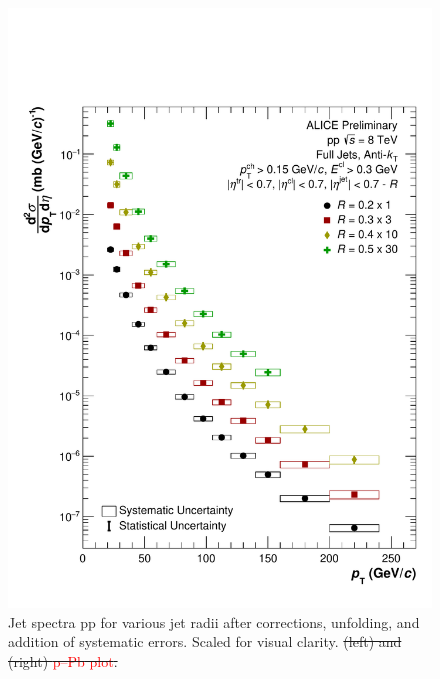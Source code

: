\documentclass[ALICE]{ALICE_analysis_notes}
\newcommand{\pPb}{{\mbox{p--Pb}}\xspace}
\newcommand{\pp}{pp\xspace}
\providecommand{\DIFaddtex}[1]{{\protect\color{blue}\uwave{#1}}} %
\providecommand{\DIFdeltex}[1]{{\protect\color{red}\sout{#1}}}                      %
\providecommand{\DIFaddFL}[1]{\DIFadd{#1}} %
\providecommand{\DIFdelFL}[1]{\DIFdel{#1}} %
\providecommand{\DIFaddbeginFL}{} %
\providecommand{\DIFaddendFL}{} %
\providecommand{\DIFdelbeginFL}{} %
\providecommand{\DIFdelendFL}{} %
\providecommand{\DIFadd}[1]{\texorpdfstring{\DIFaddtex{#1}}{#1}} %
\providecommand{\DIFdel}[1]{\texorpdfstring{\DIFdeltex{#1}}{}} %
\newcommand{\DIFscaledelfig}{0.5}
\newlength{\DIFdelgraphicswidth} %
\newlength{\DIFdelgraphicsheight} %
\newcommand{\DIFaddincludegraphics}[2][]{{\color{blue}\fbox{\DIFOincludegraphics[#1]{#2}}}} %
\newcommand{\DIFdelincludegraphics}[2][]{%
\sbox{\DIFdelgraphicsbox}{\DIFOincludegraphics[#1]{#2}}%
\settoboxwidth{\DIFdelgraphicswidth}{\DIFdelgraphicsbox} %
\settoboxtotalheight{\DIFdelgraphicsheight}{\DIFdelgraphicsbox} %
\scalebox{\DIFscaledelfig}{%
\parbox[b]{\DIFdelgraphicswidth}{\usebox{\DIFdelgraphicsbox}\\[-\baselineskip] \rule{\DIFdelgraphicswidth}{0em}}\llap{\resizebox{\DIFdelgraphicswidth}{\DIFdelgraphicsheight}{%
\setlength{\unitlength}{\DIFdelgraphicswidth}%
\begin{picture}(1,1)%
\thicklines\linethickness{2pt} %
{\color[rgb]{1,0,0}\put(0,0){\framebox(1,1){}}}%
{\color[rgb]{1,0,0}\put(0,0){\line( 1,1){1}}}%
{\color[rgb]{1,0,0}\put(0,1){\line(1,-1){1}}}%
\end{picture}%
}\hspace*{3pt}}} %
} %
\DeclareRobustCommand{\DIFaddbeginFL}{\DIFOaddbeginFL \let\includegraphics\DIFaddincludegraphics} %
\DeclareRobustCommand{\DIFaddendFL}{\DIFOaddendFL \let\includegraphics\DIFOincludegraphics} %
\DeclareRobustCommand{\DIFdelbeginFL}{\DIFOdelbeginFL \let\includegraphics\DIFdelincludegraphics} %
\DeclareRobustCommand{\DIFdelendFL}{\DIFOaddendFL \let\includegraphics\DIFOincludegraphics} %
\begin{document}
\begin{figure}
    \centering
    \includegraphics[width=15cm]{figures/FinalResults/Bayes_reg6.pdf}
    \caption{Jet spectra \DIFaddbeginFL \DIFaddFL{in }\pp \DIFaddendFL for various jet radii after corrections, unfolding, and addition of systematic errors. Scaled for visual clarity.\DIFdelbeginFL %
\DIFdelFL{(left) and }%
\DIFdelFL{(right) \textcolor{red}{\pPb plot}.}\DIFdelendFL }
    \label{fig:finalSpectra}
\end{figure}
\end{document}
